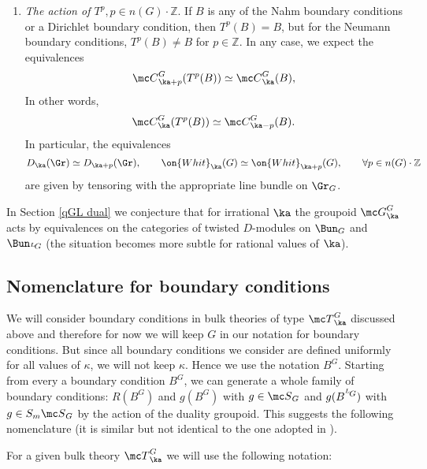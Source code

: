 \documentclass[11pt,reqno]{amsart}
\theoremstyle{plain}
\numberwithin{equation}{section}
\newcommand{\Z}{\mathbb{Z}}
\def\neg{\negthinspace}
\def\LG{{}^L\neg G}
\theoremstyle{definition}
\begin{document}
\begin{enumerate}
\bigskip

\item {\em The action of $T^p, p \in n(G) \cdot \Z$}. If $B$ is any of
  the Nahm boundary conditions or a Dirichlet boundary condition, then
  $T^p(B) = B$, but for the Neumann boundary conditions, $T^p(B) \neq
  B$ for $p \in \Z$. In any case, we expect the equivalences
$$
{\mc C}^G_{\ka+p}(T^p(B)) \simeq {\mc C}^G_\ka(B),
$$
In other words,
\begin{equation}    \label{Tp}
{\mc C}^G_\ka(T^p(B)) \simeq {\mc C}^G_{\ka-p}(B).
\end{equation}
In particular, the equivalences
\begin{equation}    \label{WhitWhit}
D_\ka(\Gr) \simeq D_{\ka+p}(\Gr), \qquad \on{Whit}_{\ka}(G) \simeq
\on{Whit}_{\ka+p}(G), \qquad \forall p \in n(G) \cdot \Z
\end{equation}
are given by tensoring with the appropriate line bundle on $\Gr_G$.
\end{enumerate}

\bigskip

In Section \ref{qGL dual} we conjecture that for irrational $\ka$ the
groupoid ${\mc G}^G_\ka$ acts by equivalences on the categories of
twisted $D$-modules on $\Bun_G$ and $\Bun_{\LG}$ (the situation
becomes more subtle for rational values of $\ka$).

\subsection{Nomenclature for boundary conditions}    \label{nomen}

We will consider boundary conditions in bulk theories of type ${\mc
  T}^G_\ka$ discussed above and therefore for now we will keep $G$ in
our notation for boundary conditions. But since all boundary
conditions we consider are defined uniformly for all values of
$\kappa$, we will not keep $\kappa$. Hence we use the notation
$B^G$. Starting from every a boundary condition $B^G$, we can generate
a whole family of boundary conditions: $R(B^G)$ and $g(B^G)$ with $g
\in {\mc S}_G$ and $g(B^{\LG})$ with $g \in S_m {\mc S}_{G}$ by the
action of the duality groupoid.
This suggests the following nomenclature (it is similar but not
identical to the one adopted in \cite{CG}).

For a given bulk theory ${\mc T}^G_\ka$ we will use the following
notation:
\end{document}
